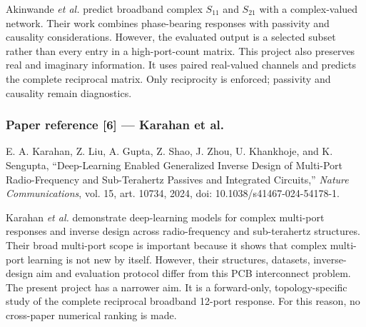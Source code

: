 Akinwande \textit{et al.} predict broadband complex $S_{11}$ and $S_{21}$ with
a complex-valued network. Their work combines phase-bearing responses with
passivity and causality considerations. However, the evaluated output is a
selected subset rather than every entry in a high-port-count matrix. This
project also preserves real and imaginary information. It uses paired
real-valued channels and predicts the complete reciprocal matrix. Only
reciprocity is enforced; passivity and causality remain diagnostics.

\subsubsection*{Paper reference [6] --- Karahan et al.}
E. A. Karahan, Z. Liu, A. Gupta, Z. Shao, J. Zhou, U. Khankhoje, and
K. Sengupta, ``Deep-Learning Enabled Generalized Inverse Design of Multi-Port
Radio-Frequency and Sub-Terahertz Passives and Integrated Circuits,''
\emph{Nature Communications}, vol. 15, art. 10734, 2024,
doi: 10.1038/s41467-024-54178-1.

Karahan \textit{et al.} demonstrate deep-learning models for complex multi-port
responses and inverse design across radio-frequency and sub-terahertz
structures. Their broad multi-port scope is important because it shows that
complex multi-port learning is not new by itself. However, their structures,
datasets, inverse-design aim and evaluation protocol differ from this PCB
interconnect problem. The present project has a narrower aim. It is a
forward-only, topology-specific study of the complete reciprocal broadband
12-port response. For this reason, no cross-paper numerical ranking is made.
